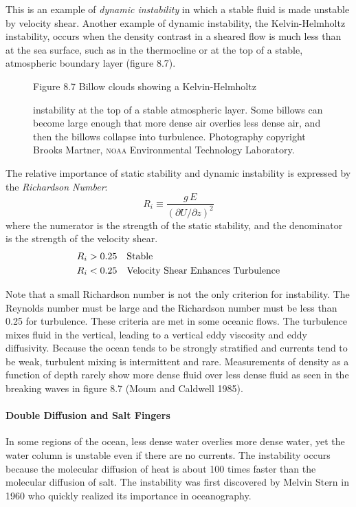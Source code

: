This is an example of
\textit{dynamic instability} in which a stable fluid is made unstable by velocity shear.
Another example of dynamic instability, the Kelvin-Helmholtz instability, occurs
when the density contrast in a sheared flow is much less than at the sea surface,
such as in the thermocline or at the top of a stable, atmospheric boundary
layer (figure 8.7).
\begin{figure}[t!]
\footnotesize
Figure 8.7
Billow clouds showing a Kelvin-Helmholtz \rule{0mm}{4ex}instability at the top of
a stable atmospheric layer. Some billows can become large enough
that more dense air overlies less dense air, and then the billows collapse into
turbulence. Photography copyright Brooks Martner, \textsc{noaa}
Environmental Technology Laboratory. 
\label{fig:helmholtz}
\vspace{-3ex}
\end{figure}

The relative importance of static stability and dynamic instability is expressed by
the \textit{Richardson Number}:
\begin{equation}
\boxed{R_i\equiv\frac{g\,E}{(\partial{U}/\partial{z})^2} }
\end{equation}
where the numerator is the strength of the static stability, and the denominator
is the strength of the velocity shear.
\begin{align}
R_i &>0.25 \quad \text{Stable} \notag \\
R_i &<0.25 \quad \text{Velocity Shear Enhances Turbulence} \notag
\end{align}

Note that a small Richardson number is not the only criterion for instability.
The Reynolds number must be large and the Richardson number must be less than
0.25 for turbulence. These criteria are met in some oceanic flows. The
turbulence mixes fluid in the vertical, leading to a vertical eddy viscosity and
eddy diffusivity. Because the ocean tends to be strongly stratified and currents
tend to be weak, turbulent mixing is intermittent and rare. Measurements of
density as a function of depth rarely show more dense fluid over less dense
fluid as seen in the breaking waves in figure 8.7 (Moum and Caldwell 1985).

\paragraph{Double Diffusion and Salt Fingers}
In some regions of the ocean, less dense water
overlies more dense water, yet the water column is unstable even if there are no
currents. The instability occurs because the molecular diffusion of heat is about
100 times faster than the molecular diffusion of salt. The instability was first
discovered by Melvin Stern in 1960 who quickly realized its importance in
oceanography.

